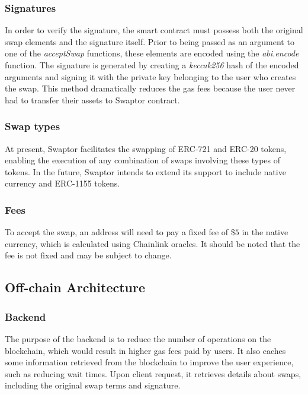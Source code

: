 \documentclass[12pt]{article}
\begin{document}
\subsubsection{Signatures}

In order to verify the signature, the smart contract must possess both the original swap elements
and the signature itself. Prior to being passed as an argument to one of the \textit{acceptSwap} functions,
these elements are encoded using the \textit{abi.encode} function. The signature is generated by creating a
\textit{keccak256} hash of the encoded arguments and signing it with the private key belonging to the user who creates the swap.
This method dramatically reduces the gas fees because the user never had to transfer their assets to Swaptor contract.

\subsubsection{Swap types}

At present, Swaptor facilitates the swapping of ERC-721 and ERC-20 tokens, enabling the execution of any combination of swaps involving these types of tokens.
In the future, Swaptor intends to extend its support to include native currency and ERC-1155 tokens.

\subsubsection{Fees}
To accept the swap, an address will need to pay a fixed fee of \$$5$ in the native currency, which is calculated using Chainlink oracles\cite{chainlink}. It should be noted that the fee is not fixed and may be subject to change.

\subsection{Off-chain Architecture}

\subsubsection{Backend}
The purpose of the backend is to reduce the number of operations on the blockchain,
which would result in higher gas fees paid by users. It also caches some information
retrieved from the blockchain to improve the user experience, such as reducing wait
times. Upon client request, it retrieves details about swaps, including the original
swap terms and signature.
\end{document}
